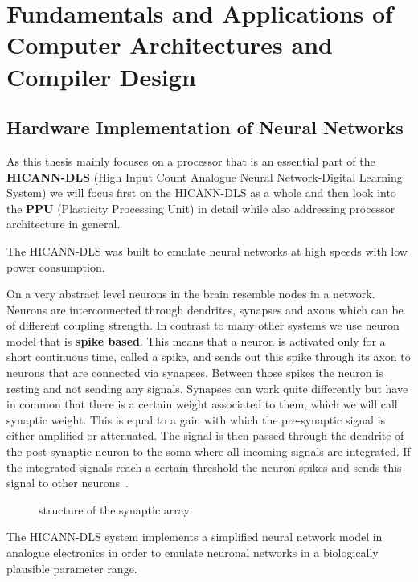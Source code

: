 \chapter{Fundamentals and Applications of Computer Architectures and Compiler Design}
\label{chapter:methods}

\section{Hardware Implementation of Neural Networks}
As this thesis mainly focuses on a processor that is an essential part of the \textbf{HICANN-DLS} (High Input Count Analogue Neural Network-Digital Learning System) we will focus first on the HICANN-DLS as a whole and then look into the \textbf{PPU} (Plasticity Processing Unit) in detail while also addressing processor architecture in general.

The HICANN-DLS was built to emulate neural networks at high speeds with low power consumption.

On a very abstract level neurons in the brain resemble nodes in a network.
Neurons are interconnected through dendrites, synapses and axons which can be of different coupling strength. 
In contrast to many other systems  we use neuron model that is \textbf{spike based}.
This means that a neuron is activated only for a short continuous time, called a spike, and sends out this spike through its axon to neurons that are connected via synapses.
Between those spikes the neuron is resting and not sending any signals.
Synapses can work quite differently but have in common that there is a certain weight associated to them, which we will call synaptic weight.
This is equal to a gain with which the pre-synaptic signal is either amplified or attenuated.
The signal is then passed through the dendrite of the post-synaptic neuron to the soma where all incoming signals are integrated.
If the integrated signals reach a certain threshold the neuron spikes and sends this signal to other neurons~\citep{silbernagl2009color}.

\begin{figure}
    \caption{\label{fig:array} structure of the synaptic array}
\end{figure}

The HICANN-DLS system implements a simplified neural network model in analogue electronics in order to emulate neuronal networks in a biologically plausible parameter range.

